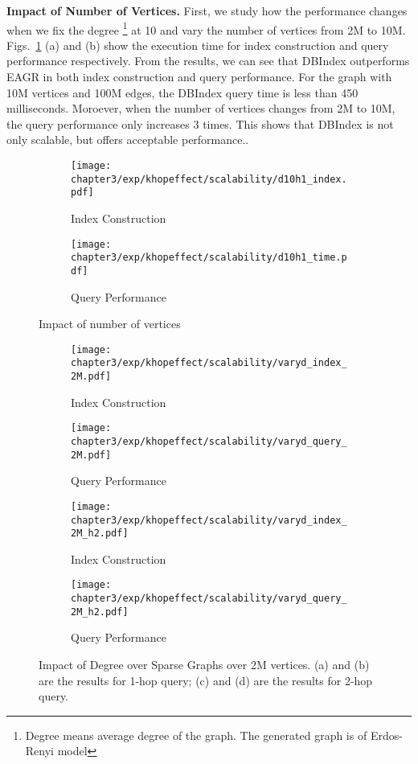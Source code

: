 \textbf{Impact of Number of Vertices.} First, we study how the performance 
changes when we fix the degree \footnote{Degree means average degree of the graph. The generated graph is of Erdos-Renyi model } at 10 and vary the number of vertices from 
2M to 10M. Figs.~\ref{fig:khop_d10_h1} (a) and (b) show
the execution time for index construction and query performance respectively.
From the results, we can see that DBIndex outperforms EAGR in
both index construction and query performance. For the graph with 
10M vertices and 100M edges, the DBIndex query time is less than 
450 milliseconds. 
Moroever, when the number of vertices changes from 2M to 10M, 
the query performance only increases 3 times. This shows that
DBIndex is not only scalable, but offers acceptable performance..   

\begin{figure}[t]
\centering
\begin{subfigure}{0.48\linewidth}
  \centering
  \texttt{[image: chapter3/exp/khopeffect/scalability/d10h1\_index.pdf]}
  \caption{Index Construction}
\end{subfigure}
\begin{subfigure}{0.48\linewidth}
  \centering
  \texttt{[image: chapter3/exp/khopeffect/scalability/d10h1\_time.pdf]}
  \caption{Query Performance}
\end{subfigure}%
\caption{Impact of number of vertices }
\label{fig:khop_d10_h1}
\end{figure}

\begin{figure}[t]
\centering
\begin{subfigure}{0.46\linewidth}
  \centering
  \texttt{[image: chapter3/exp/khopeffect/scalability/varyd\_index\_2M.pdf]}
  \caption{Index Construction}
\end{subfigure}
\begin{subfigure}{0.50\linewidth}
  \centering
  \texttt{[image: chapter3/exp/khopeffect/scalability/varyd\_query\_2M.pdf]}
  \caption{Query Performance}
\end{subfigure}
\begin{subfigure}{0.50\linewidth}
  \centering
  \texttt{[image: chapter3/exp/khopeffect/scalability/varyd\_index\_2M\_h2.pdf]}
  \caption{Index Construction}
\end{subfigure}
\begin{subfigure}{0.46\linewidth}
  \centering
  \texttt{[image: chapter3/exp/khopeffect/scalability/varyd\_query\_2M\_h2.pdf]}
  \caption{Query Performance}
\end{subfigure}
\caption{Impact of Degree over Sparse Graphs over 2M vertices. (a) and (b) are the results for 1-hop query; (c) and (d) are the results for 2-hop query. }
\label{fig:khop_v2m}
\end{figure}

